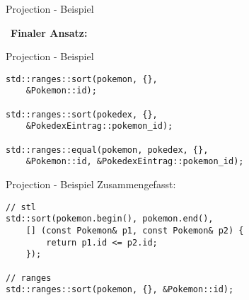 \begin{frame}{Projection - Beispiel}
    \begin{center}
        \✨ \ \textbf{Finaler Ansatz:} \ \✨
    \end{center}
\end{frame}

\begin{frame}[fragile]{Projection - Beispiel}
    \begin{verbatim}
std::ranges::sort(pokemon, {},
    &Pokemon::id);

std::ranges::sort(pokedex, {},
    &PokedexEintrag::pokemon_id);

std::ranges::equal(pokemon, pokedex, {},
    &Pokemon::id, &PokedexEintrag::pokemon_id);
    \end{verbatim}
\end{frame}

\begin{frame}[fragile]{Projection - Beispiel}
    Zusammengefasst:

    \begin{verbatim}
// stl
std::sort(pokemon.begin(), pokemon.end(),
    [] (const Pokemon& p1, const Pokemon& p2) {
        return p1.id <= p2.id;
    });

// ranges
std::ranges::sort(pokemon, {}, &Pokemon::id);
    \end{verbatim}
\end{frame}